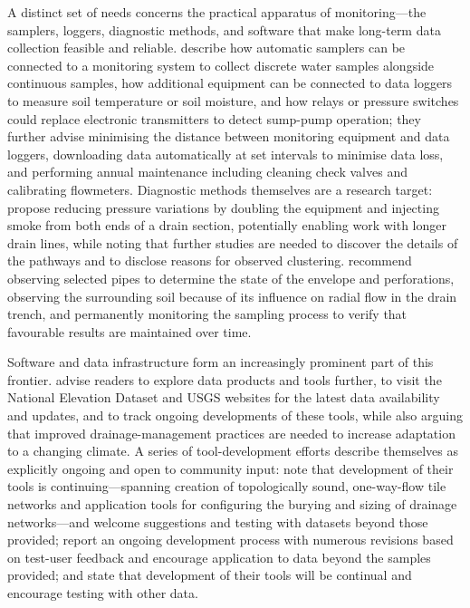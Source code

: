 A distinct set of needs concerns the practical apparatus of monitoring---the samplers, loggers, diagnostic methods, and software that make long-term data collection feasible and reliable. \textcite{Kanwar1999} describe how automatic samplers can be connected to a monitoring system to collect discrete water samples alongside continuous samples, how additional equipment can be connected to data loggers to measure soil temperature or soil moisture, and how relays or pressure switches could replace electronic transmitters to detect sump-pump operation; they further advise minimising the distance between monitoring equipment and data loggers, downloading data automatically at set intervals to minimise data loss, and performing annual maintenance including cleaning check valves and calibrating flowmeters. Diagnostic methods themselves are a research target: \textcite{Petersen2012} propose reducing pressure variations by doubling the equipment and injecting smoke from both ends of a drain section, potentially enabling work with longer drain lines, while noting that further studies are needed to discover the details of the pathways and to disclose reasons for observed clustering. \textcite{MartínezBeltrán2007} recommend observing selected pipes to determine the state of the envelope and perforations, observing the surrounding soil because of its influence on radial flow in the drain trench, and permanently monitoring the sampling process to verify that favourable results are maintained over time.

Software and data infrastructure form an increasingly prominent part of this frontier. \textcite{Shedekar2018} advise readers to explore data products and tools further, to visit the National Elevation Dataset and USGS websites for the latest data availability and updates, and to track ongoing developments of these tools, while also arguing that improved drainage-management practices are needed to increase adaptation to a changing climate. A series of tool-development efforts describe themselves as explicitly ongoing and open to community input: \textcite{Falasy2025} note that development of their tools is continuing---spanning creation of topologically sound, one-way-flow tile networks and application tools for configuring the burying and sizing of drainage networks---and welcome suggestions and testing with datasets beyond those provided; \textcite{Falasy2025b} report an ongoing development process with numerous revisions based on test-user feedback and encourage application to data beyond the samples provided; and \textcite{Falasy2024} state that development of their tools will be continual and encourage testing with other data.

